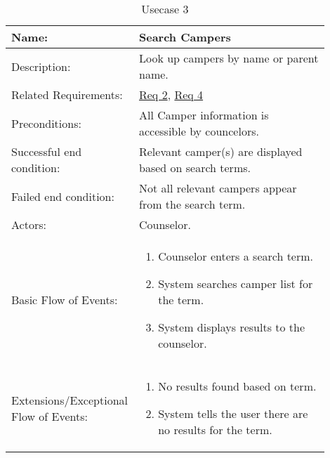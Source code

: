 \documentclass[11pt]{article}
\begin{document}
\begin{table}[!htb]
\caption{Usecase 3}
\label{des:search campers}
\begin{center}
\begin{tabular}{p{0.30\linewidth}p{0.60\linewidth}}
	Name: & Search Campers \\\hline
	Description: & Look up campers by name or parent name. \\\hline
	Related Requirements:& \hyperlink{Req2}{Req 2}, \hyperlink{Req4}{Req 4}\\\hline
	Preconditions:& All Camper information is accessible by councelors.\\\hline
	Successful end condition:& Relevant camper(s) are displayed based on search terms.\\\hline
	Failed end condition:& Not all relevant campers appear from the search term.\\\hline
	Actors:& Counselor.\\\hline
	Basic Flow of Events: & \begin{enumerate}[topsep=0pt]
		\item Counselor enters a search term.
		\item System searches camper list for the term.
		\item System displays results to the counselor.
	\end{enumerate}\\\hline
	Extensions/Exceptional Flow of Events: & \begin{enumerate}[topsep=0pt]
		\item No results found based on term.
		\item System tells the user there are no results for the term.	
	\end{enumerate}
\end{tabular}
\end{center}
\end{table}
\end{document}
